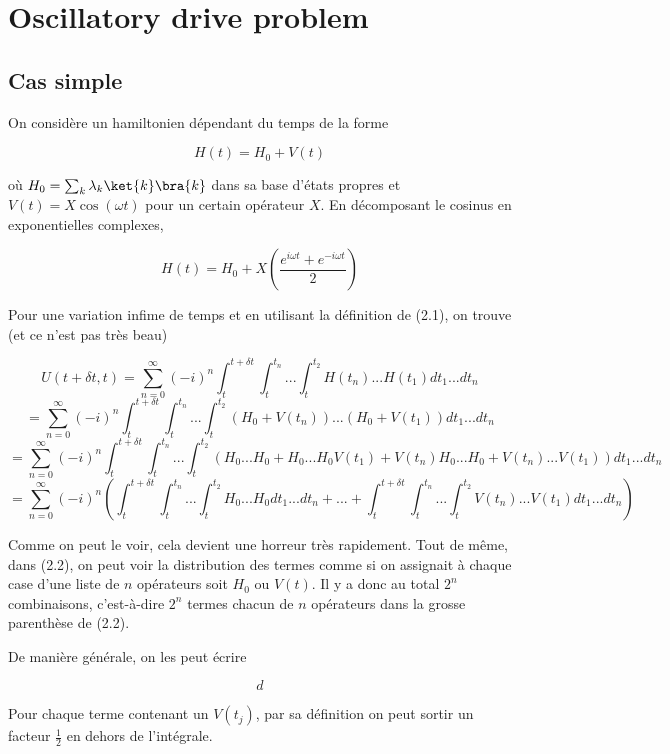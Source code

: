 \section{Oscillatory drive problem}
\subsection{Cas simple}
On considère un hamiltonien dépendant du temps de la forme 

\begin{equation}
    H(t) = H_0 + V(t)
\end{equation}

où $H_0 = \sum_{k} \lambda_k \ket{k}\bra{k}$ dans sa base d'états propres et $V(t) = X\cos(\omega t)$ pour un certain opérateur $X$. En décomposant le cosinus en exponentielles complexes, 

\begin{equation*}
    H(t) = H_0 + X\left(\frac{e^{i \omega t} + e^{-i\omega t}}{2}\right)
\end{equation*}

Pour une variation infime de temps et en utilisant la définition de (2.1), on trouve (et ce n'est pas très beau)

\begin{equation*}
    U(t+\delta t, t) = \sum_{n=0}^{\infty} (-i)^n \int_{t}^{t+\delta t}\int_{t}^{t_n}...\int_{t}^{t_2}H(t_n)...H(t_1)dt_1 ... dt_n
\end{equation*}
\begin{equation*}
    = \sum_{n=0}^{\infty} (-i)^n \int_{t}^{t+\delta t}\int_{t}^{t_n}...\int_{t}^{t_2}\left(H_0 + 
    V(t_n)\right)...\left(H_0 + V(t_1)\right)dt_1 ... dt_n
\end{equation*}
\begin{equation*}
    = \sum_{n=0}^{\infty} (-i)^n \int_{t}^{t+\delta t}\int_{t}^{t_n}...\int_{t}^{t_2} \left(H_0...H_0 + H_0...H_0V(t_1) + V(t_n)H_0...H_0 + V(t_n)...V(t_1)\right)dt_1 ... dt_n
\end{equation*}
\begin{equation}
    = \sum_{n=0}^{\infty}(-i)^n \left(\int_{t}^{t+\delta t}\int_{t}^{t_n}...\int_{t}^{t_2}H_0...H_0dt_1 ... dt_n + ... + \int_{t}^{t+\delta t}\int_{t}^{t_n}...\int_{t}^{t_2}V(t_n)...V(t_1)dt_1 ... dt_n \right)
\end{equation}

Comme on peut le voir, cela devient une horreur très rapidement. Tout de même, dans (2.2), on peut voir la distribution des termes comme si on assignait à chaque case d'une liste de $n$ opérateurs soit $H_0$ ou $V(t)$. Il y a donc au total $2^n$ combinaisons, c'est-à-dire $2^n$ termes chacun de $n$ opérateurs dans la grosse parenthèse de (2.2). 




De manière générale, on les peut écrire 

\begin{equation*}
    d
\end{equation*}



Pour chaque terme contenant un $V(t_j)$, par sa définition on peut sortir un facteur $\frac{1}{2}$ en dehors de l'intégrale.


